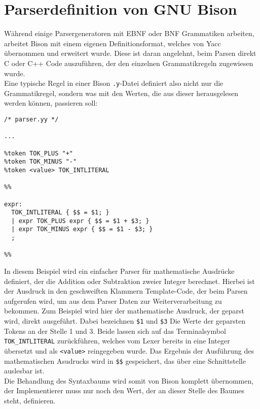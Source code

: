 \section{Parserdefinition von GNU Bison}

Während einige Parsergeneratoren mit EBNF oder BNF Grammatiken arbeiten, arbeitet Bison mit einem eigenen Definitionsformat, welches von Yacc übernommen und erweitert wurde.
Diese ist daran angelehnt, beim Parsen direkt C oder C++ Code auszuführen, der den einzelnen Grammatikregeln zugewiesen wurde.\\
Eine typische Regel in einer Bison \texttt{.y}-Datei definiert also nicht nur die Grammatikregel, sondern was mit den Werten, die aus dieser herausgelesen werden können, passieren soll:

\begin{lstlisting}
/* parser.yy */

...

%token TOK_PLUS "+"
%token TOK_MINUS "-"
%token <value> TOK_INTLITERAL

%%

expr:
  TOK_INTLITERAL { $$ = $1; }
  | expr TOK_PLUS expr { $$ = $1 + $3; }
  | expr TOK_MINUS expr { $$ = $1 - $3; }
  ;

%%
\end{lstlisting}

In diesem Beispiel wird ein einfacher Parser für mathematische Ausdrücke definiert, der die Addition oder Subtraktion zweier Integer berechnet.
Hierbei ist der Ausdruck in den geschweiften Klammern Template-Code, der beim Parsen aufgerufen wird, um aus dem Parser Daten zur Weiterverarbeitung zu bekommen.
Zum Beispiel wird hier der mathematische Ausdruck, der geparst wird, direkt ausgeführt.
Dabei bezeichnen \texttt{\$1} und \texttt{\$3} Die Werte der geparsten Tokens an der Stelle 1 und 3.
Beide lassen sich auf das Terminalsymbol \texttt{TOK\_INTLITERAL} zurückführen, welches vom Lexer bereits in eine Integer übersetzt und als \texttt{<value>} reingegeben wurde. 
Das Ergebnis der Ausführung des mathematischen Asudrucks wird in \texttt{\$\$} gespeichert, das über eine Schnittstelle auslesbar ist.\\
Die Behandlung des Syntaxbaums wird somit von Bison komplett übernommen, der Implementierer muss nur noch den Wert, der an dieser Stelle des Baumes steht, definieren.


